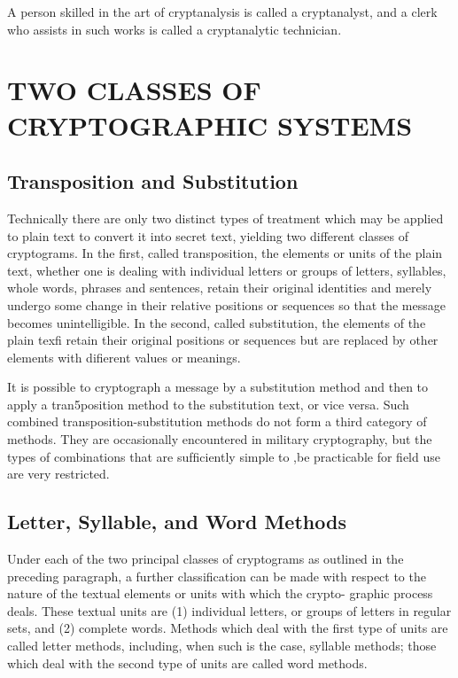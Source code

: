 \mypara A person skilled in the art of cryptanalysis is called a cryptanalyst,
and a clerk who assists in such works is called a cryptanalytic technician.

\section{TWO CLASSES OF CRYPTOGRAPHIC SYSTEMS}

\subsection{Transposition and Substitution}

\mypara Technically there are only two distinct types of treatment which
may be applied to plain text to convert it into secret text, yielding two
different classes of cryptograms. In the ﬁrst, called transposition, the
elements or units of the plain text, whether one is dealing with individual
letters or groups of letters, syllables, whole words, phrases and sentences,
retain their original identities and merely undergo some change in their
relative positions or sequences so that the message becomes unintelligible.
In the second, called substitution, the elements of the plain texﬁ retain
their original positions or sequences but are replaced by other elements
with diﬁerent values or meanings.

\mypara It is possible to cryptograph a message by a substitution method
and then to apply a tran5position method to the substitution text, or vice
versa. Such combined transposition-substitution methods do not form a
third category of methods. They are occasionally encountered in military
cryptography, but the types of combinations that are sufﬁciently simple to
,be practicable for ﬁeld use are very restricted.

\subsection{Letter, Syllable, and Word Methods}

Under each of the two principal classes of cryptograms as outlined in
the preceding paragraph, a further classiﬁcation can be made with respect
to the nature of the textual elements or units with which the crypto-
graphic process deals. These textual units are (1) individual letters, or
groups of letters in regular sets, and (2) complete words. Methods which
deal with the ﬁrst type of units are called letter methods, including, when
such is the case, syllable methods; those which deal with the second type
of units are called word methods.

